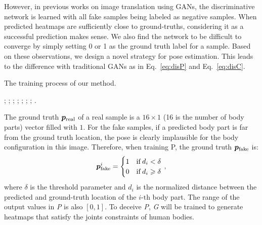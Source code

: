 \documentclass[10pt,journal,compsoc]{IEEEtran}
\begin{document}
However, in previous works on image translation using GANs, the discriminative network is learned with  all fake samples being labeled as negative samples.
When predicted heatmaps are sufficiently close  to ground-truths, considering it as a successful prediction makes sense. We also find the network to be difficult to converge by simply setting 0 or 1 as the ground truth label for a sample.
Based on these observations, we design a novel strategy for pose estimation. This leads to the difference with traditional GANs as in Eq.~\eqref{eq:disP} and Eq.~\eqref{eq:disC}.

\begin{algorithm}[t]
\caption{The training process of our method.}
\label{alg:The-training-process}
\small
\begin{algorithmic}[1]{
;
;
;
;
;
;
;
.
}\end{algorithmic}
\end{algorithm}


The ground truth $\bm{p}_{\rm real}$ of a real sample is a $16\times 1$ (16 is the number of body parts) vector filled with $1$.
For the fake samples, if a predicted body part is far from the ground truth location, the pose is clearly implausible for the body configuration in this image.
Therefore, when training P, the ground truth $\bm{p}_{\rm fake}$ is:
\begin{equation}
\nonumber
\bm{p}_{\rm fake}^{i}=\begin{cases}
1 & {\rm if}\thinspace d_{i}<\delta\\
0 & {\rm if}\thinspace d_{i}\geqslant\delta
\end{cases}\,,
\end{equation}
where $\delta$ is the threshold parameter and $d_{i}$ is the normalized distance between the predicted and ground-truth location of the $i$-$\textrm{th}$ body part.
The range of the output values in \textit{P} is also $\left[0,1\right]$.
To deceive \textit{P}, \textit{G} will be trained to generate heatmaps
that satisfy the joints constraints of human bodies.
\end{document}
